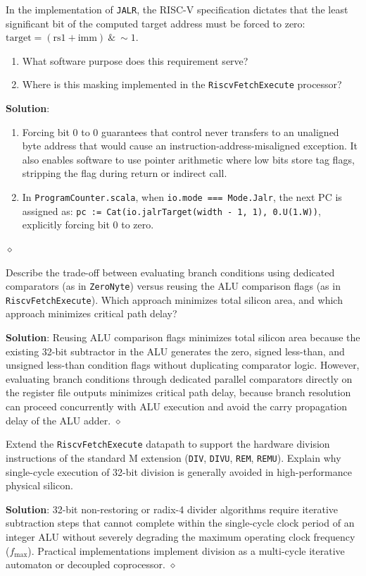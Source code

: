 \begin{problem}
In the implementation of \texttt{JALR}, the RISC-V specification dictates that the least significant bit of the computed target address must be forced to zero: $\text{target} = (\text{rs1} + \text{imm}) \ \& \ \sim 1$.
\begin{enumerate}
    \item What software purpose does this requirement serve?
    \item Where is this masking implemented in the \texttt{RiscvFetchExecute} processor?
\end{enumerate}

\textbf{Solution}:
\begin{enumerate}
    \item Forcing bit 0 to 0 guarantees that control never transfers to an unaligned byte address that would cause an instruction-address-misaligned exception. It also enables software to use pointer arithmetic where low bits store tag flags, stripping the flag during return or indirect call.
    \item In \texttt{ProgramCounter.scala}, when \texttt{io.mode === Mode.Jalr}, the next PC is assigned as:
    \texttt{pc := Cat(io.jalrTarget(width - 1, 1), 0.U(1.W))}, explicitly forcing bit 0 to zero.
\end{enumerate}
$\diamond$
\end{problem}

\begin{problem}
Describe the trade-off between evaluating branch conditions using dedicated comparators (as in \texttt{ZeroNyte}) versus reusing the ALU comparison flags (as in \texttt{RiscvFetchExecute}). Which approach minimizes total silicon area, and which approach minimizes critical path delay?

\textbf{Solution}:
Reusing ALU comparison flags minimizes total silicon area because the existing 32-bit subtractor in the ALU generates the zero, signed less-than, and unsigned less-than condition flags without duplicating comparator logic. However, evaluating branch conditions through dedicated parallel comparators directly on the register file outputs minimizes critical path delay, because branch resolution can proceed concurrently with ALU execution and avoid the carry propagation delay of the ALU adder.
$\diamond$
\end{problem}

\begin{problem}
Extend the \texttt{RiscvFetchExecute} datapath to support the hardware division instructions of the standard M extension (\texttt{DIV}, \texttt{DIVU}, \texttt{REM}, \texttt{REMU}). Explain why single-cycle execution of 32-bit division is generally avoided in high-performance physical silicon.

\textbf{Solution}:
32-bit non-restoring or radix-4 divider algorithms require iterative subtraction steps that cannot complete within the single-cycle clock period of an integer ALU without severely degrading the maximum operating clock frequency ($f_{\text{max}}$). Practical implementations implement division as a multi-cycle iterative automaton or decoupled coprocessor.
$\diamond$
\end{problem}